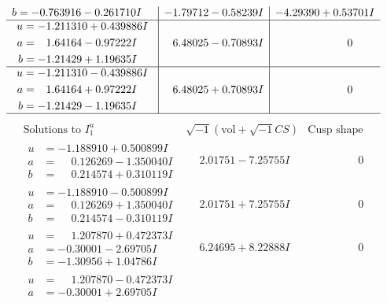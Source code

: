 \documentclass[1p]{elsarticle_modified}
\theoremstyle{definition}
\newcommand{\I}{\sqrt{-1}}
\begin{document}
$$\begin{array}{c|c|c}
\begin{aligned}
b &= -0.763916 - 0.261710 I\end{aligned}
 & -1.79712 - 0.58239 I & -4.29390 + 0.53701 I \\ \hline\begin{aligned}
u &= -1.211310 + 0.439886 I \\
a &= \phantom{-}1.64164 - 0.97222 I \\
b &= -1.21429 + 1.19635 I\end{aligned}
 & \phantom{-}6.48025 - 0.70893 I & \phantom{-0.000000 } 0 \\ \hline\begin{aligned}
u &= -1.211310 - 0.439886 I \\
a &= \phantom{-}1.64164 + 0.97222 I \\
b &= -1.21429 - 1.19635 I\end{aligned}
 & \phantom{-}6.48025 + 0.70893 I & \phantom{-0.000000 } 0\\
 \hline 
 \end{array}$$\newpage$$\begin{array}{c|c|c}  
\text{Solutions to }I^u_{1}& \I (\text{vol} + \sqrt{-1}CS) & \text{Cusp shape}\\
 \hline 
\begin{aligned}
u &= -1.188910 + 0.500899 I \\
a &= \phantom{-}0.126269 - 1.350040 I \\
b &= \phantom{-}0.214574 + 0.310119 I\end{aligned}
 & \phantom{-}2.01751 - 7.25755 I & \phantom{-0.000000 } 0 \\ \hline\begin{aligned}
u &= -1.188910 - 0.500899 I \\
a &= \phantom{-}0.126269 + 1.350040 I \\
b &= \phantom{-}0.214574 - 0.310119 I\end{aligned}
 & \phantom{-}2.01751 + 7.25755 I & \phantom{-0.000000 } 0 \\ \hline\begin{aligned}
u &= \phantom{-}1.207870 + 0.472373 I \\
a &= -0.30001 - 2.69705 I \\
b &= -1.30956 + 1.04786 I\end{aligned}
 & \phantom{-}6.24695 + 8.22888 I & \phantom{-0.000000 } 0 \\ \hline\begin{aligned}
u &= \phantom{-}1.207870 - 0.472373 I \\
a &= -0.30001 + 2.69705 I \\

\end{aligned}
\end{array}$$
\end{document}
